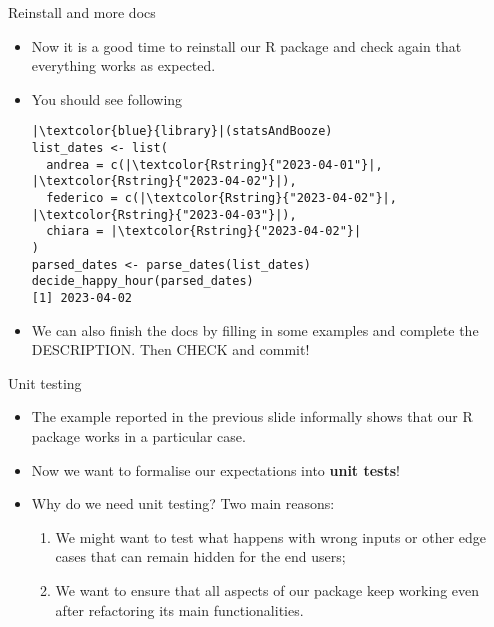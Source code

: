 \documentclass[
hyperref={bookmarks=false},
xcolor={dvipsnames,svgnames*,x11names*}, 
12pt
]{beamer}
\begin{document}
\begin{frame}[fragile]{Reinstall and more docs}
\vspace{-0.5cm}
\begin{itemize}
\itemsep 2ex
\item Now it is a good time to reinstall our R package and check again that everything works as expected. 
\item You should see following
\begin{lstlisting}
|\textcolor{blue}{library}|(statsAndBooze)
list_dates <- list(
  andrea = c(|\textcolor{Rstring}{"2023-04-01"}|, |\textcolor{Rstring}{"2023-04-02"}|), 
  federico = c(|\textcolor{Rstring}{"2023-04-02"}|, |\textcolor{Rstring}{"2023-04-03"}|), 
  chiara = |\textcolor{Rstring}{"2023-04-02"}|
)
parsed_dates <- parse_dates(list_dates)
decide_happy_hour(parsed_dates)
[1] 2023-04-02
\end{lstlisting}
\item We can also finish the docs by filling in some examples and complete the DESCRIPTION. Then CHECK and commit!
\end{itemize}
\end{frame}

\begin{frame}[fragile]{Unit testing}
\vspace{-0.5cm}
\begin{itemize}
\itemsep 2ex
\item The example reported in the previous slide informally shows that our R package works in a particular case. 
\item Now we want to formalise our expectations into \textbf{unit tests}!
\item Why do we need unit testing? Two main reasons: 
\begin{enumerate}
\itemsep 1ex
\item We might want to test what happens with wrong inputs or other edge cases that can remain hidden for the end users;
\item We want to ensure that all aspects of our package keep working even after refactoring its main functionalities. 
\end{enumerate}
\end{itemize}
\end{frame}
\end{document}
